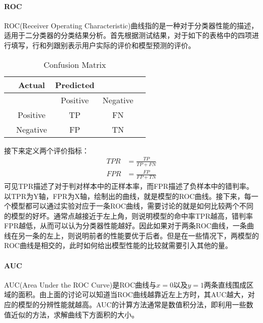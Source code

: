 \paragraph{ROC}
ROC(Receiver Operating Characteristic)曲线指的是一种对于分类器性能的描述，适用于二分类器的分类结果分析\cite{EVA}。首先根据测试结果，对于如下的表格中的四项进行填写，行和列跟别表示用户实际的评价和模型预测的评价。
\begin{table}[htbp]
		\caption{Confusion Matrix} \label{tab:table}
		\centering
		\begin{tabular}{ccccc}
			\hline	%
			& Actual & Predicted &  \\
			\hline	%
			&  & Positive & Negative   \\
			& Positive & TP & FN  \\
			& Negative & FP & TN  \\
			\hline	%
		\end{tabular}
\end{table}
接下来定义两个评价指标：
\begin{align}
    TPR &= \frac{TP}{TP+FN}\\
    FPR &= \frac{FP}{FP+TN}
\end{align}
可见TPR描述了对于判对样本中的正样本率，而FPR描述了负样本中的错判率。以TPR为Y轴，FPR为X轴，绘制出的曲线，就是模型的ROC曲线。接下来，每一个模型都可以通过实验对应于一条ROC曲线，需要讨论的就是如何比较两个不同的模型的好坏。通常点越接近于左上角，则说明模型的命中率TPR越高，错判率FPR越低，从而可以认为分类器性能越好。因此如果对于两条ROC曲线，一条曲线在另一条的左上，则说明前者的性能要优于后者。但是在一些情况下，两模型的ROC曲线是相交的，此时如何给出模型性能的比较就需要引入其他的量。

\paragraph{AUC}
AUC(Area Under the ROC Curve)是ROC曲线与$x=0$以及$y=1$两条直线围成区域的面积。由上面的讨论可以知道当ROC曲线越靠近左上方时，其AUC越大，对应的模型的分辨性能就越高\cite{AUC}。AUC的计算方法通常是数值积分法，即利用一些数值近似的方法，求解曲线下方面积的大小\cite{AUCCalculate}。
